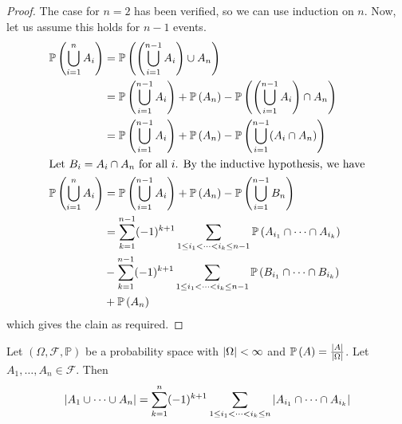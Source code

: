 \documentclass{article}
\begin{document}
\begin{proof}
	The case for $n=2$ has been verified, so we can use induction on $n$. Now, let us assume this holds for $n-1$ events.
	\begin{align*}
		\mathbb{P}\left({\bigcup_{i=1}^n A_i}\right) & = \mathbb{P}\left({\left( \bigcup_{i=1}^{n-1} A_i  \right) \cup A_n}\right)                                                     \\
		                           & = \mathbb{P}\left({\bigcup_{i=1}^{n-1} A_i}\right) + \mathbb{P}\left({A_n}\right) - \mathbb{P}\left({\left( \bigcup_{i=1}^{n-1} A_i  \right) \cap A_n}\right)       \\
		                           & = \mathbb{P}\left({\bigcup_{i=1}^{n-1} A_i}\right) + \mathbb{P}\left({A_n}\right) - \mathbb{P}\left({\bigcup_{i=1}^{n-1} (A_i \cap A_n)}\right)                     \\
		\intertext{Let $B_i = A_i \cap A_n$ for all $i$. By the inductive hypothesis, we have}
		\mathbb{P}\left({\bigcup_{i=1}^n A_i}\right) & = \mathbb{P}\left({\bigcup_{i=1}^{n-1} A_i}\right) + \mathbb{P}\left({A_n}\right) - \mathbb{P}\left({\bigcup_{i=1}^{n-1} B_n}\right)                                \\
		                           & = \sum_{k=1}^{n-1} (-1)^{k+1} \sum_{1 \leq i_1 < \dots < i_k \leq n-1} \mathbb{P}\left({A_{i_1} \cap \dots \cap A_{i_k}}\right) \\&- \sum_{k=1}^{n-1} (-1)^{k+1} \sum_{1 \leq i_1 < \dots < i_k \leq n-1} \mathbb{P}\left({B_{i_1} \cap \dots \cap B_{i_k}}\right) \\ &+ \mathbb{P}\left({A_n}\right)
	\end{align*}
	which gives the clain as required.
\end{proof}

Let $(\Omega, \mathcal F, \mathbb P)$ be a probability space with $\abs{\Omega} < \infty$ and $\mathbb{P}\left({A}\right) = \frac{\abs{A}}{\abs{\Omega}}$. Let $A_1, \dots, A_n \in \mathcal F$. Then
\[ \abs{A_1 \cup \dots \cup A_n} = \sum_{k=1}^n (-1)^{k+1} \sum_{1 \leq i_1 < \dots < i_k \leq n} \abs{A_{i_1} \cap \dots \cap A_{i_k}} \]
\end{document}
